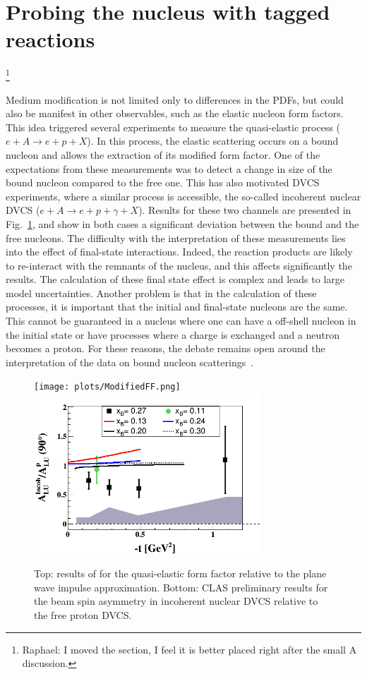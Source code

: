\section{Probing the nucleus with tagged reactions} 
\footnote{Raphael: I moved the section, I feel it is better placed right after the small A discussion.}

Medium modification is not limited only to differences in the PDFs,
but could also be manifest in other observables, such as the elastic nucleon form factors.
This idea
triggered several experiments to measure the quasi-elastic 
process ($e+A \rightarrow e+p+X$). In this process, the 
elastic scattering occurs on a bound nucleon and allows the extraction of its modified 
form factor. One of the expectations from these measurements was to detect a change
in size of the bound nucleon compared to the free one. This has also motivated 
DVCS experiments, where a similar process is accessible, the so-called
incoherent nuclear DVCS ($e+A \rightarrow e+p+\gamma+X$). Results for these two 
channels are presented in Fig.~\ref{fig:QEincoh}, and show in both cases a 
significant deviation between the bound and the free nucleons. 
The difficulty with the interpretation of these measurements lies into the 
effect of final-state interactions. Indeed, the reaction products are likely
to re-interact with the remnants of the nucleus, and this affects significantly the
results. The calculation of these final state effect is complex and leads to large model 
uncertainties. 
Another problem is that in the calculation of these processes, it is important
that the initial and final-state nucleons are the same. This cannot be guaranteed
in a nucleus where one can have a off-shell nucleon in the initial state or 
have processes where a charge is exchanged and a neutron becomes a proton. For
these reasons, the debate remains open around 
the interpretation of the data on bound nucleon scatterings~\cite{Benhar:2006wy}.

\begin{figure}[tbp!]
\center
\texttt{[image: plots/ModifiedFF.png]}
\includegraphics[width=8.5cm]{plots/ALU_ratioInc_t_shortscenrario-without-error-onX.png}
\caption{Top: results of \cite{Strauch:2002wu} for the quasi-elastic form factor relative to
the plane wave impulse approximation. Bottom: CLAS preliminary results 
for the beam spin asymmetry in incoherent nuclear DVCS relative to the free proton DVCS.}
\label{fig:QEincoh}
\end{figure}

